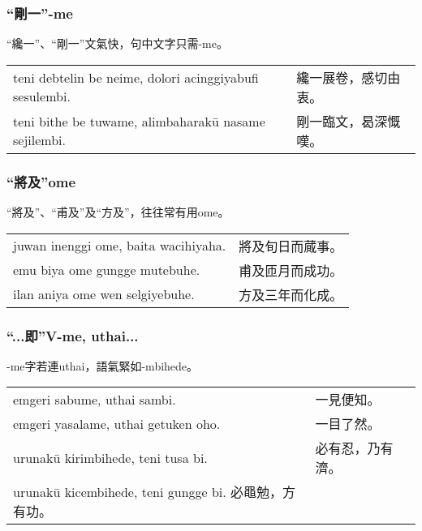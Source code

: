 \documentclass{article}
\begin{document}
\subsubsection{“剛一”-me}
\noindent “纔一”、“剛一”文氣快，句中文字只需-me。
\begin{center}
    \begin{tabularx}{\textwidth}{XX}
        teni debtelin be neime, dolori acinggiyabufi sesulembi. & 纔一展卷，感切由衷。\\
        teni bithe be tuwame, alimbaharak\={u} nasame sejilembi. & 剛一臨文，曷深慨嘆。
    \end{tabularx}
\end{center}

\subsubsection{“將及”ome}
\noindent “將及”、“甫及”及“方及”，往往常有用ome。
\begin{center}
    \begin{tabularx}{\textwidth}{XX}
        juwan inenggi ome, baita wacihiyaha. & 將及旬日而蕆事。\\
        emu biya ome gungge mutebuhe. & 甫及匝月而成功。\\
        ilan aniya ome wen selgiyebuhe. & 方及三年而化成。
    \end{tabularx}
\end{center}

\subsubsection{“...即”V-me, uthai...}
\noindent -me字若連uthai，語氣緊如-mbihede。
\begin{center}
    \begin{tabularx}{\textwidth}{XX}
        emgeri sabume, uthai sambi. & 一見便知。\\
        emgeri yasalame, uthai getuken oho. & 一目了然。\\
        urunak\={u} kirimbihede, teni tusa bi. & 必有忍，乃有濟。\\
        urunak\={u} kicembihede, teni gungge bi. 必黽勉，方有功。
    \end{tabularx}
\end{center}
\end{document}
